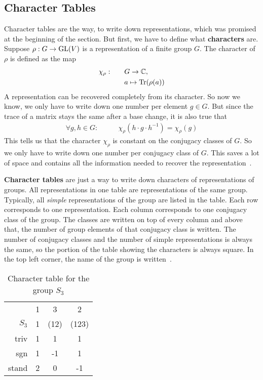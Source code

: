 \subsection{Character Tables}

Character tables are the way, to write down representations, which was promised at the beginning of the section.
But first, we have to define what \textbf{characters} are.
Suppose $\rho: G \to \operatorname{GL}(V)$ is a representation of a finite group $G$.
The character of $\rho$ is defined as the map
\begin{subequations}
    \begin{align}
        \chi_\rho: \qquad & G \to \mathbb{C}, \\
        & a \mapsto \operatorname{Tr}(\rho(a))
    \end{align}
\end{subequations}
A representation can be recovered completely from its character.
So now we know, we only have to write down one number per element $g \in G$.
But since the trace of a matrix stays the same after a base change, it is also true that
\begin{align}
    \forall g, h \in G: \qquad & \chi_\rho(h \cdot g \cdot h^{-1}) = \chi_\rho(g)
\end{align}
This tells us that the character $\chi_\rho$ is constant on the conjugacy classes of $G$.
So we only have to write down one number per conjugacy class of $G$.
This saves a lot of space and contains all the information needed to recover the representation~\cite{fulton2013}.

\textbf{Character tables} are just a way to write down characters of representations of groups.
All representations in one table are representations of the same group.
Typically, all \textit{simple} representations of the group are listed in the table.
Each row corresponds to one representation.
Each column corresponds to one conjugacy class of the group.
The classes are written on top of every column and above that, the number of group elements of that conjugacy class is written.
The number of conjugacy classes and the number of simple representations is always the same, so the portion of the table showing the characters is always square.
In the top left corner, the name of the group is written~\cite{fulton2013}.

\begin{table}
    \centering

    \begin{tabular}{r | c  c  c}
                & 1 & 3     & 2     \\
        $S_3$   & 1 & (12)  & (123) \\ \hline
        triv    & 1 & 1     & 1     \\
        sgn     & 1 & -1    & 1     \\
        stand   & 2 & 0     & -1
    \end{tabular}

    \caption{Character table for the group $S_3$}
    \label{tab:reprep.char.table}
\end{table}

